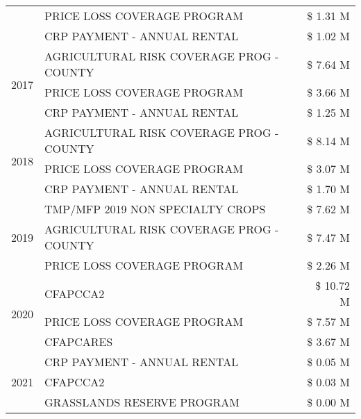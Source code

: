 \begin{tabular}{llr}
 & PRICE LOSS COVERAGE PROGRAM & \$ 1.31 M \\
 & CRP PAYMENT - ANNUAL RENTAL & \$ 1.02 M \\
\cline{1-3}
\multirow[t]{3}{*}{2017} & AGRICULTURAL RISK COVERAGE PROG - COUNTY & \$ 7.64 M \\
 & PRICE LOSS COVERAGE PROGRAM & \$ 3.66 M \\
 & CRP PAYMENT - ANNUAL RENTAL & \$ 1.25 M \\
\cline{1-3}
\multirow[t]{3}{*}{2018} & AGRICULTURAL RISK COVERAGE PROG - COUNTY & \$ 8.14 M \\
 & PRICE LOSS COVERAGE PROGRAM & \$ 3.07 M \\
 & CRP PAYMENT - ANNUAL RENTAL & \$ 1.70 M \\
\cline{1-3}
\multirow[t]{3}{*}{2019} & TMP/MFP 2019 NON SPECIALTY CROPS & \$ 7.62 M \\
 & AGRICULTURAL RISK COVERAGE PROG - COUNTY & \$ 7.47 M \\
 & PRICE LOSS COVERAGE PROGRAM & \$ 2.26 M \\
\cline{1-3}
\multirow[t]{3}{*}{2020} & CFAPCCA2 & \$ 10.72 M \\
 & PRICE LOSS COVERAGE PROGRAM & \$ 7.57 M \\
 & CFAPCARES & \$ 3.67 M \\
\cline{1-3}
\multirow[t]{3}{*}{2021} & CRP PAYMENT - ANNUAL RENTAL & \$ 0.05 M \\
 & CFAPCCA2 & \$ 0.03 M \\
 & GRASSLANDS RESERVE PROGRAM & \$ 0.00 M \\
\cline{1-3}
\bottomrule
\end{tabular}
